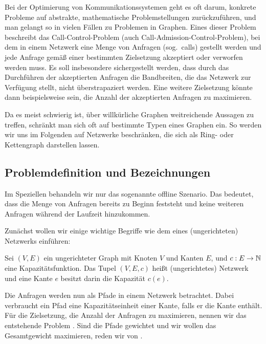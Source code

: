 Bei der Optimierung von Kommunikationssystemen geht es oft darum, konkrete Probleme auf abstrakte, mathematische 
Problemstellungen zurückzuführen, und man gelangt so in vielen Fällen zu Problemen in Graphen.
Eines dieser Problem beschreibt das Call-Control-Problem (auch Call-Admission-Control-Problem), bei dem
in einem Netzwerk eine Menge von Anfragen (sog.\ calls) gestellt werden und jede Anfrage gemäß einer bestimmten Zielsetzung
akzeptiert oder verworfen werden muss.
Es soll insbesondere sichergestellt werden, dass durch das Durchführen der akzeptierten Anfragen die Bandbreiten,
die das Netzwerk zur Verfügung stellt, nicht überstrapaziert werden.
Eine weitere Zielsetzung könnte dann beispielsweise sein, die Anzahl der akzeptierten Anfragen zu maximieren.

Da es meist schwierig ist, über willkürliche Graphen weitreichende Aussagen zu treffen, schränkt
man sich oft auf bestimmte Typen eines Graphen ein.
So werden wir uns im Folgenden auf Netzwerke beschränken, die sich als Ring- oder Kettengraph darstellen lassen.

\subsection{Problemdefinition und Bezeichnungen}
Im Speziellen behandeln wir nur das sogenannte offline Szenario.
Das bedeutet, dass die Menge von Anfragen bereits zu Beginn feststeht und keine weiteren Anfragen während der
Laufzeit hinzukommen.

Zunächst wollen wir einige wichtige Begriffe wie dem eines (ungerichteten) Netzwerks einführen:

\begin{definition}[Netzwerk]
	Sei $(V,E)$ ein ungerichteter Graph mit Knoten $V$ und Kanten $E$, und $c: E \to \mathbb N$ eine Kapazitätsfunktion.
	Das Tupel $(V,E,c)$ heißt (ungerichtetes) Netzwerk und eine Kante $e$ besitzt darin die Kapazität $c(e)$.
\end{definition}

Die Anfragen werden nun als Pfade in einem Netzwerk betrachtet.
Dabei verbraucht ein Pfad eine Kapazitätseinheit einer Kante, falls er die Kante enthält.
Für die Zielsetzung, die Anzahl der Anfragen zu maximieren, nennen wir das entstehende Problem \CallControl.
Sind die Pfade gewichtet und wir wollen das Gesamtgewicht maximieren, reden wir von \WeightedCallControl.

